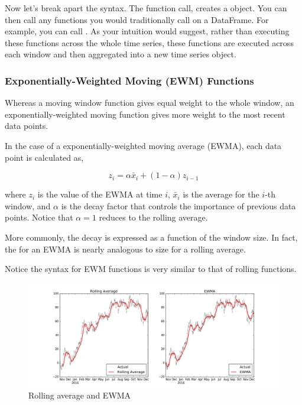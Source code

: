Now let's break apart the syntax. The function call,  creates a  object. You can then call any functions you would traditionally call on a DataFrame. For example, you can call . As your intuition would suggest, rather than executing these functions across the whole time series, these functions are executed across each window and then aggregated into a new time series object.

\subsubsection*{Exponentially-Weighted Moving (EWM) Functions}
Whereas a moving window function gives equal weight to the whole window, an exponentially-weighted moving function gives more weight to the most recent data points.

In the case of a exponentially-weighted moving average (EWMA), each data point is calculated as,

$$
z_i = \alpha \bar{x}_i + (1 - \alpha)z_{i-1}
$$

where $z_i$ is the value of the EWMA at time $i$, $\bar{x}_i$ is the average for the $i$-th window, and $\alpha$ is the decay factor that controls the importance of previous data points. Notice that $\alpha=1$ reduces to the rolling average.

More commonly, the decay is expressed as a function of the window size. In fact, the  for an EWMA is nearly analogous to  size for a rolling average.

Notice the syntax for EWM functions is very similar to that of rolling functions.

\begin{figure} \label{fig:moving}
    \includegraphics[width=\textwidth]{moving.pdf}
    \caption{Rolling average and EWMA}
\end{figure}

